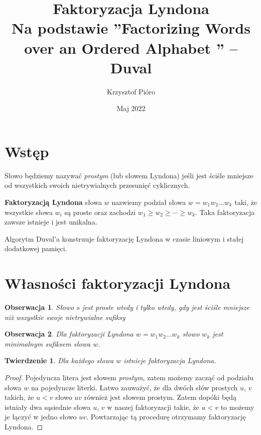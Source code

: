 \documentclass{article}
\title{Faktoryzacja Lyndona\\ \large Na podstawie ''Factorizing Words over an Ordered Alphabet '' -- Duval}
\author{Krzysztof Pióro}
\date{Maj 2022}
\newtheorem{theorem}{Twierdzenie}
\newtheorem{observation}{Obserwacja}
\begin{document}
\maketitle

\section{Wstęp}

Słowo będziemy nazywać \textit{prostym} (lub słowem Lyndona) jeśli jest ściśle mniejsze od wszystkich swoich nietrywialnych przesunięć cyklicznych.

\textbf{Faktoryzacją Lyndona} słowa $w$ nazwiemy podział słowa $w = w_1w_2\ldots w_k$ taki, że wszystkie słowa $w_i$ są proste oraz zachodzi
$w_1 \geq w_2 \geq \cdots \geq w_k$. Taka faktoryzacja zawsze istnieje i jest unikalna.

Algorytm Duval'a konstruuje faktoryzację Lyndona w czasie liniowym i stałej dodatkowej pamięci.



\section{Własności faktoryzacji Lyndona}

\begin{observation}
    Słowo $s$ jest \textit{proste} wtedy i tylko wtedy, gdy jest ściśle mniejsze niż wszystkie swoje nietrywialne sufiksy 
\end{observation}

\begin{observation}
    Dla faktoryzacji Lyndona $w = w_1w_2\ldots w_k$ słowo $w_k$ jest minimalnym sufiksem słowa $w$. 
\end{observation}

\begin{theorem}
    Dla każdego słowa $w$ istnieje faktoryzacja Lyndona.
\end{theorem}

\begin{proof}
    Pojedyncza litera jest słowem \textit{prostym}, zatem możemy zacząć od podziału słowa $w$ na pojedyncze literki.
    Łatwo zauważyć, że dla dwóch słów prostych $u$, $v$ takich, że $u < v$ słowo $uv$ również jest słowem prostym.
    Zatem dopóki będą istniały dwa sąsiednie słowa $u$, $v$ w naszej faktoryzacji takie, że $u < v$ to możemy je łączyć w jedno słowo $uv$.
    Powtarzając tą procedurę otrzymamy faktoryzację Lyndona.
\end{proof}
\end{document}
